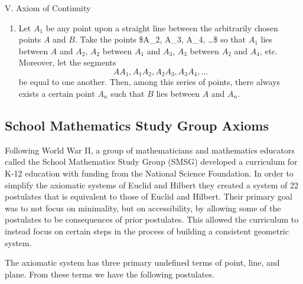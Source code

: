 \documentclass[
]{book}
\providecommand{\tightlist}{%
  \setlength{\itemsep}{0pt}\setlength{\parskip}{0pt}}
\theoremstyle{definition}
\theoremstyle{definition}
\theoremstyle{definition}
\theoremstyle{definition}
\theoremstyle{remark}
\begin{document}
V. Axiom of Continuity

\begin{enumerate}
\def\labelenumi{\arabic{enumi}.}
\tightlist
\item
  Let \(A_1\) be any point upon a straight line between the arbitrarily chosen points \(A\) and \(B\). Take the points \$A\_2, A\_3, A\_4, \ldots \$ so that \(A_1\) lies between \(A\) and \(A_2\), \(A_2\) between \(A_1\) and \(A_3\), \(A_3\) between \(A_2\) and \(A_4\), etc. Moreover, let the segments \[AA_1, A_1A_2, A_2A_3, A_3A_4, \ldots\] be equal to one another. Then, among this series of points, there always exists a certain point \(A_n\) such that \(B\) lies between \(A\) and \(A_n\).
\end{enumerate}

\hypertarget{school-mathematics-study-group-axioms}{%
\subsection{School Mathematics Study Group Axioms}\label{school-mathematics-study-group-axioms}}

Following World War II, a group of mathematicians and mathematics educators called the School Mathematics Study Group (SMSG) developed a curriculum for K-12 education with funding from the National Science Foundation. In order to simplify the axiomatic systems of Euclid and Hilbert they created a system of 22 postulates that is equivalent to those of Euclid and Hilbert. Their primary goal was to not focus on minimality, but on accessibility, by allowing some of the postulates to be consequences of prior postulates. This allowed the curriculum to instead focus on certain steps in the process of building a consistent geometric system.

The \citet{SMSG_Geometry} axiomatic system has three primary undefined terms of point, line, and plane. From these terms we have the following postulates.
\end{document}
